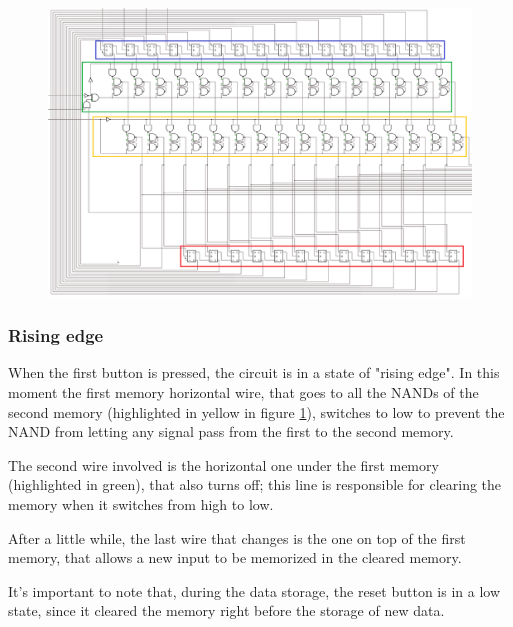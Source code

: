 \documentclass{article}
\begin{document}
\begin{figure}[h]
    \centering
    \includegraphics[scale=.55]{IM_Converter.PNG}
    \caption{}
    \label{Converter}
\end{figure}


\subsubsection{Rising edge}

When the first button is pressed, the circuit is in a state of "rising edge". In this moment the first memory horizontal wire, that goes to all the NANDs of the second memory (highlighted in yellow in figure \ref{Converter}), switches to low to prevent the NAND from letting any signal pass from the first to the second memory.

\vspace{1mm}

The second wire involved is the horizontal one under the first memory (highlighted in green), that also turns off; this line is responsible for clearing the memory when it switches from high to low.

\vspace{1mm}

After a little while, the last wire that changes is the one on top of the first memory, that allows a new input to be memorized in the cleared memory.

\vspace{3mm}

It's important to note that, during the data storage, the reset button is in a low state, since it cleared the memory right before the storage of new data.
\end{document}
